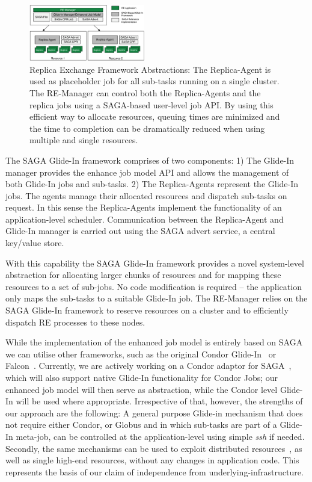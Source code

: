 \documentclass[conference,final]{IEEEtran}
\newcommand{\up}{\vspace*{-1em}}
\begin{document}
\up
\begin{figure}[htbp]
    \centering
        \includegraphics[width=0.45\textwidth]{remdmanager_v11.pdf}
        \caption{Replica Exchange Framework Abstractions: The
          Replica-Agent is used as placeholder job for all sub-tasks
          running on a single cluster. The RE-Manager can control both
          the Replica-Agents and the replica jobs using a SAGA-based
          user-level job API. By using this efficient way to allocate
          resources, queuing times are minimized and the time to
          completion can be dramatically reduced when using multiple
          and single resources. \up}
    \label{fig:remdmanager_v11}
\end{figure}  


The SAGA Glide-In framework comprises of two components: 1) The
Glide-In manager provides the enhance job model API and allows the
management of both Glide-In jobs and sub-tasks.  2) The Replica-Agents
represent the Glide-In jobs. The agents manage their allocated
resources and dispatch sub-tasks on request. In this sense the
Replica-Agents implement the functionality of an application-level
scheduler. Communication between the Replica-Agent and Glide-In
manager is carried out using the SAGA advert service, a central
key/value store.

With this capability the SAGA Glide-In framework provides a novel
system-level abstraction for allocating larger chunks of resources and
for mapping these resources to a set of sub-jobs.%
No code modification is required -- the application only maps the
sub-tasks to a suitable Glide-In job.  The RE-Manager relies on the
SAGA Glide-In framework to reserve resources on a cluster and to
efficiently dispatch RE processes to these nodes.

While the implementation of the enhanced job model is entirely based
on SAGA %
we can utilise other frameworks, such as the original Condor
Glide-In~\cite{citeulike:291860} or Falcon~\cite{1362680}. Currently,
we are actively working on a Condor adaptor for
SAGA~\cite{saga_condor}, which will also support native Glide-In
functionality for Condor Jobs; our enhanced job model will then serve
as abstraction, while the Condor level Glide-In will be used where
appropriate.  Irrespective of that, however, the strengths of our
approach are the following: A general purpose Glide-in mechanism that
does not require either Condor, or Globus and in which sub-tasks are
part of a Glide-In meta-job, can be controlled at the
application-level using simple {\it ssh} if needed. Secondly, the same
mechanisms can be used to exploit distributed
resources~\cite{repex_ptrsa}, as well as single high-end resources,
without any changes in application code.  This represents the basis of
our claim of independence from underlying-infrastructure.
\end{document}
